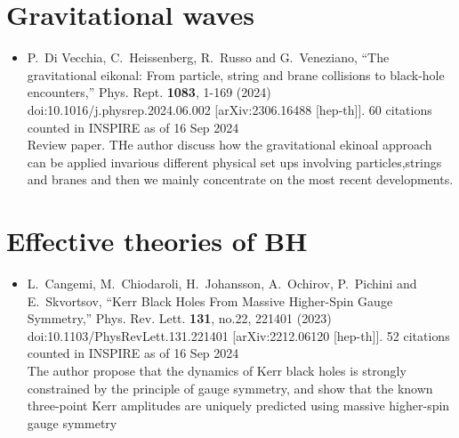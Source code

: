 \documentclass[a4paper,12pt]{article}
\begin{document}
\section*{Gravitational waves}
\begin{itemize}
    \item %
    P.~Di Vecchia, C.~Heissenberg, R.~Russo and G.~Veneziano,
    ``The gravitational eikonal: From particle, string and brane collisions to black-hole encounters,''
    Phys. Rept. \textbf{1083}, 1-169 (2024)
    doi:10.1016/j.physrep.2024.06.002
    [arXiv:2306.16488 [hep-th]].
    60 citations counted in INSPIRE as of 16 Sep 2024\\
    Review paper. THe author discuss how the gravitational ekinoal approach can be applied invarious different physical
    set ups involving particles,strings and branes and then we mainly concentrate on the most recent
    developments.
\end{itemize}
\section*{Effective theories of BH}
\begin{itemize}
    \item %
    L.~Cangemi, M.~Chiodaroli, H.~Johansson, A.~Ochirov, P.~Pichini and E.~Skvortsov,
    ``Kerr Black Holes From Massive Higher-Spin Gauge Symmetry,''
    Phys. Rev. Lett. \textbf{131}, no.22, 221401 (2023)
    doi:10.1103/PhysRevLett.131.221401
    [arXiv:2212.06120 [hep-th]].
    52 citations counted in INSPIRE as of 16 Sep 2024\\
    The author propose that the dynamics of Kerr black holes is strongly constrained by the principle of
    gauge symmetry, and show that the known three-point Kerr amplitudes are uniquely
    predicted using massive higher-spin gauge symmetry
\end{itemize}
\end{document}
